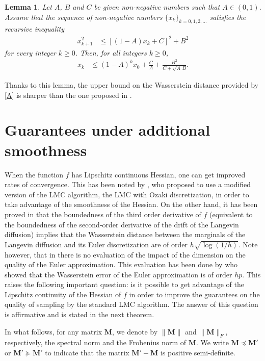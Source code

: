\documentclass[aoap,preprint,reqno,a4paper]{imsart} %
\newcommand{\bfM}{\mathbf M}
\newtheorem{lemma}{Lemma}
\begin{document}
\begin{lemma}\label{lemD}
Let $A$, $B$ and $C$ be given non-negative numbers such that $A\in (0,1)$. Assume that the sequence of non-negative numbers
$\{x_k\}_{k=0,1,2,\ldots}$ satisfies the recursive inequality
\begin{align}
x^2_{k+1}&\le [(1-A)x_k+C]^2+B^2
\end{align}
for every integer $k\ge 0$.  Then, for all integers $k\ge 0$,
\begin{align}
x_k&\le (1-A)^{k} x_0 + \frac{C}{A} + \frac{B^2}{C+\sqrt{A}\,B}.
\end{align}
\end{lemma}

Thanks to this lemma, the upper bound on the Wasserstein distance provided by \eqref{A} is sharper
than the one proposed in \citep{DalalyanColt}.


\section{Guarantees under additional smoothness}
\label{sec:5}

When the function $f$ has Lipschitz continuous Hessian, one can get improved rates of
convergence. This has been noted by \citep{Dalalyan14}, who proposed to use a modified
version of the LMC algorithm, the LMC with Ozaki discretization, in order to take
advantage of the smoothness of the Hessian. On the other hand, it has been proved
in \citep{alfonsi2014,alfonsi2015} that the boundedness of the third order derivative of $f$
(equivalent to the boundedness of the second-order derivative of the drift of the
Langevin diffusion) implies that the Wasserstein distance between the marginals
of the Langevin diffusion and its Euler discretization are of order $h\sqrt{\log(1/h)}$.
Note however, that in \citep{alfonsi2015} there is no evaluation of the impact of
the dimension on the quality of the Euler approximation. This evaluation has been done by
\cite{Durmus2} who showed that the Wasserstein error of the Euler approximation is
of order $hp$. This raises the following important question: is it possible to get
advantage of the Lipschitz continuity of the Hessian of $f$ in order to improve the
guarantees on the quality of sampling by the standard LMC algorithm. The answer of
this question is affirmative and is stated in the next theorem.

In what follows, for any matrix $\bfM$, we denote by $\|\bfM\|$ and $\|\bfM\|_F$,
respectively, the spectral norm and the Frobenius norm of $\bfM$. We write
$\bfM\preceq\bfM'$ or $\bfM'\succeq\bfM'$ to indicate that the matrix $\bfM'-\bfM$
is positive semi-definite.
\end{document}
